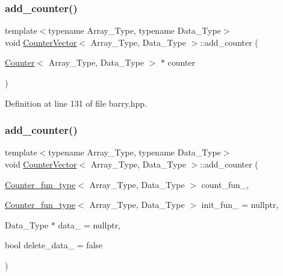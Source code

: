 \mbox{\label{classbarry_1_1_counter_vector_a062d52e18f1d3ba4c00cbf4c2d89f1e7}} 
\subsubsection{\texorpdfstring{add\+\_\+counter()}{add\_counter()}\hspace{0.1cm}{\footnotesize\ttfamily [2/3]}}
{\footnotesize\ttfamily template$<$typename Array\+\_\+\+Type, typename Data\+\_\+\+Type$>$ \\
void \hyperlink{classbarry_1_1_counter_vector}{Counter\+Vector}$<$ Array\+\_\+\+Type, Data\+\_\+\+Type $>$\+::add\+\_\+counter (\begin{DoxyParamCaption}\item[{\hyperlink{classbarry_1_1_counter}{Counter}$<$ Array\+\_\+\+Type, Data\+\_\+\+Type $>$ $\ast$}]{counter }\end{DoxyParamCaption})\hspace{0.3cm}{\ttfamily [inline]}}



Definition at line 131 of file barry.\+hpp.

\mbox{\label{classbarry_1_1_counter_vector_adb32ff1af45bc05a292a5cb064dc414d}} 
\subsubsection{\texorpdfstring{add\+\_\+counter()}{add\_counter()}\hspace{0.1cm}{\footnotesize\ttfamily [3/3]}}
{\footnotesize\ttfamily template$<$typename Array\+\_\+\+Type, typename Data\+\_\+\+Type$>$ \\
void \hyperlink{classbarry_1_1_counter_vector}{Counter\+Vector}$<$ Array\+\_\+\+Type, Data\+\_\+\+Type $>$\+::add\+\_\+counter (\begin{DoxyParamCaption}\item[{\hyperlink{namespacebarry_abaaae3200da8e4b7faac3c04fe9c3081}{Counter\+\_\+fun\+\_\+type}$<$ Array\+\_\+\+Type, Data\+\_\+\+Type $>$}]{count\+\_\+fun\+\_\+,  }\item[{\hyperlink{namespacebarry_abaaae3200da8e4b7faac3c04fe9c3081}{Counter\+\_\+fun\+\_\+type}$<$ Array\+\_\+\+Type, Data\+\_\+\+Type $>$}]{init\+\_\+fun\+\_\+ = {\ttfamily nullptr},  }\item[{Data\+\_\+\+Type $\ast$}]{data\+\_\+ = {\ttfamily nullptr},  }\item[{bool}]{delete\+\_\+data\+\_\+ = {\ttfamily false} }\end{DoxyParamCaption})\hspace{0.3cm}{\ttfamily [inline]}}



